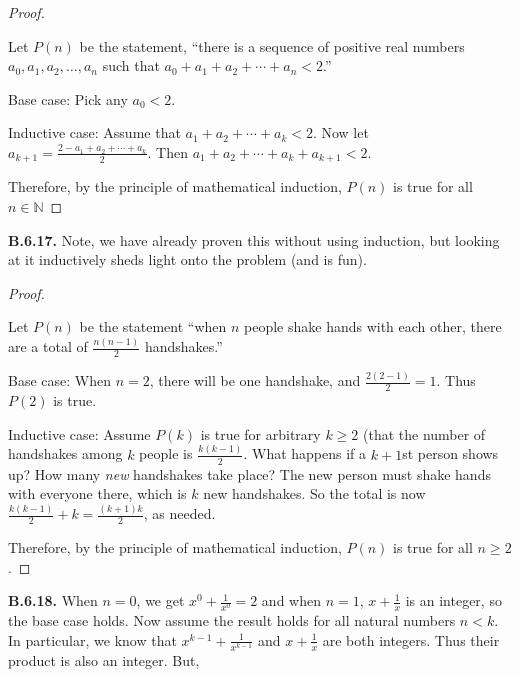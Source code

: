 \documentclass[10pt,]{book}
\theoremstyle{plain}
\theoremstyle{definition}
\theoremstyle{definition}
\theoremstyle{definition}
\theoremstyle{definition}
\numberwithin{equation}{chapter}
\def\N{\mathbb N}
\newcommand{\lt}{<}
\begin{document}
\begin{proof}\hypertarget{proof-54}{}
\hypertarget{p-2206}{}%
Let \(P(n)\) be the statement, ``there is a sequence of positive real numbers \(a_0, a_1, a_2, \ldots, a_n\) such that \(a_0 + a_1 + a_2 + \cdots + a_n \lt  2\).''%
\par
\hypertarget{p-2207}{}%
Base case: Pick any \(a_0 \lt  2\).%
\par
\hypertarget{p-2208}{}%
Inductive case: Assume that \(a_1 + a_2 + \cdots + a_k \lt  2\). Now let \(a_{k+1} = \frac{2- a_1 + a_2 + \cdots + a_k}{2}\). Then \(a_1 + a_2 + \cdots +a_k + a_{k+1} \lt  2\).%
\par
\hypertarget{p-2209}{}%
Therefore, by the principle of mathematical induction, \(P(n)\) is true for all \(n \in \N\)%
\end{proof}
\par\smallskip
\noindent\textbf{B.6.17.} \hypertarget{p-2211}{}%
Note, we have already proven this without using induction, but looking at it inductively sheds light onto the problem (and is fun).%
\begin{proof}\hypertarget{proof-55}{}
\hypertarget{p-2212}{}%
Let \(P(n)\) be the statement ``when \(n\) people shake hands with each other, there are a total of \(\frac{n(n-1)}{2}\) handshakes.''%
\par
\hypertarget{p-2213}{}%
Base case: When \(n=2\), there will be one handshake, and \(\frac{2(2-1)}{2} = 1\).  Thus \(P(2)\) is true.%
\par
\hypertarget{p-2214}{}%
Inductive case: Assume \(P(k)\) is true for arbitrary \(k\ge 2\) (that the number of handshakes among \(k\) people is \(\frac{k(k-1)}{2}\).  What happens if a \(k+1\)st person shows up?  How many \emph{new} handshakes take place?  The new person must shake hands with everyone there, which is \(k\) new  handshakes.  So the total is now \(\frac{k(k-1)}{2} + k = \frac{(k+1)k}{2}\), as needed.%
\par
\hypertarget{p-2215}{}%
Therefore, by the principle of mathematical induction, \(P(n)\) is true for all \(n \ge 2\).%
\end{proof}
\par\smallskip
\noindent\textbf{B.6.18.} \hypertarget{p-2217}{}%
When \(n = 0\), we get \(x^0 +\frac{1}{x^0} = 2\) and when \(n = 1\), \(x + \frac{1}{x}\) is an integer, so the base case holds. Now assume the result holds for all natural numbers \(n \lt  k\). In particular, we know that \(x^{k-1} + \frac{1}{x^{k-1}}\) and \(x + \frac{1}{x}\) are both integers. Thus their product is also an integer. But,%
\end{document}
